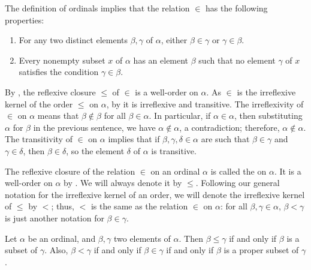 \documentclass{article}
\begin{document}
The definition of ordinals implies that the relation \(\in\) has the
following properties:
\begin{enumerate}
\item For any two distinct elements \(\beta, \gamma\) of \(\alpha\),
  either \(\beta \in \gamma\) or \(\gamma \in \beta\).
\item Every nonempty subset \(x\) of \(\alpha\) has an element
  \(\beta\) such that no element \(\gamma\) of \(x\) satisfies the
  condition \(\gamma \in \beta\).
\end{enumerate}
By , the reflexive closure \(\leq\) of \(\in\) is a
well-order on \(\alpha\).  As \(\in\) is the irreflexive kernel of the
order \(\leq\) on \(\alpha\), by  it is irreflexive
and transitive.  The irreflexivity of \(\in\) on \(\alpha\) means that
\(\beta \notin \beta\) for all \(\beta \in \alpha\).  In particular,
if \(\alpha \in \alpha\), then substituting \(\alpha\) for \(\beta\)
in the previous sentence, we have \(\alpha \notin \alpha\), a
contradiction; therefore, \(\alpha \notin \alpha\).  The transitivity
of \(\in\) on \(\alpha\) implies that if
\(\beta, \gamma, \delta \in \alpha\) are such that
\(\beta \in \gamma\) and \(\gamma \in \delta\), then
\(\beta \in \delta\), so the element \(\delta\) of \(\alpha\) is
transitive.

The reflexive closure of the relation \(\in\) on an ordinal \(\alpha\)
is called the  on \(\alpha\).  It is a
well-order on \(\alpha\) by .  We will always
denote it by \(\leq\).  Following our general notation for the
irreflexive kernel of an order, we will denote the irreflexive kernel
of \(\leq\) by \(<\); thus, \(<\) is the same as the relation \(\in\)
on \(\alpha\): for all \(\beta, \gamma \in \alpha\),
\(\beta < \gamma\) is just another notation for \(\beta \in \gamma\).

\begin{theorem}
  \label{thm:86se6zr0}
  Let \(\alpha\) be an ordinal, and \(\beta, \gamma\) two elements of
  \(\alpha\).  Then \(\beta \leq \gamma\) if and only if \(\beta\) is
  a subset of \(\gamma\).  Also, \(\beta < \gamma\) if and only if
  \(\beta \in \gamma\) if and only if \(\beta\) is a proper subset of
  \(\gamma\).
\end{theorem}
\end{document}
